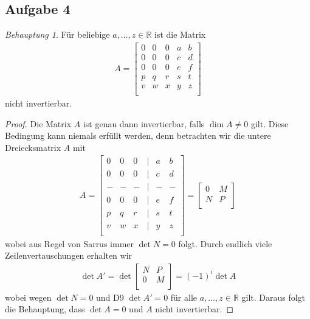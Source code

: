 \documentclass[fleqn,draft,a5paper]{article}
\theoremstyle{remark}
\newtheorem*{Behauptung}{Behauptung}
\begin{document}
\subsection{Aufgabe 4}
  \begin{Behauptung}
    Für beliebige $a, \ldots, z \in \mathbb{R}$ ist die Matrix
    \begin{align*}
      A =
      \begin{bmatrix}
        0 & 0 & 0 & a & b \\
        0 & 0 & 0 & c & d \\
        0 & 0 & 0 & e & f \\
        p & q & r & s & t \\
        v & w & x & y & z \\
      \end{bmatrix}
    \end{align*}
    nicht invertierbar.
  \end{Behauptung}
  \begin{proof}
    Die Matrix $A$ ist genau dann invertierbar, falls $\dim A \ne 0$
    gilt.  Diese Bedingung kann niemals erfüllt werden, denn
    betrachten wir die untere Dreiecksmatrix $A$ mit
    \begin{align*}
            A =
      \begin{bmatrix}
        0 & 0 & 0 & \mid & a & b \\
        0 & 0 & 0 & \mid & c & d \\
        - & - & - & \mid & - & - \\
        0 & 0 & 0 & \mid & e & f \\
        p & q & r & \mid & s & t \\
        v & w & x & \mid & y & z \\
      \end{bmatrix}
      =
      \begin{bmatrix}
        0 & M \\
        N & P \\
      \end{bmatrix}
    \end{align*}
    wobei aus Regel von Sarrus immer $\det N = 0$  folgt.   Durch
    endlich viele Zeilenvertauschungen erhalten wir
    \begin{align*}
      \det A' = \det
      \begin{bmatrix}
        N & P \\
        0 & M \\
      \end{bmatrix}
      = (-1)^{i} \det A
    \end{align*}
    wobei wegen $\det N = 0$ und D9 $\det A' = 0$ für alle $a, \ldots, z \in
    \mathbb{R}$ gilt.  Daraus folgt die Behauptung, dass $\det A = 0$ und $A$
    nicht invertierbar.
  \end{proof}
\end{document}
